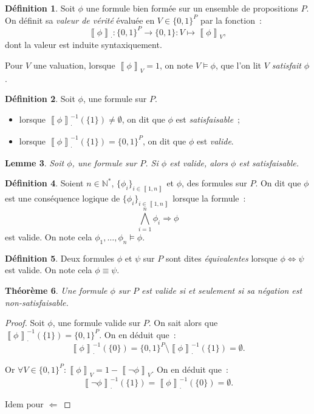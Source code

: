 \documentclass{article}
\newtheorem{thm}{Théorème}[section]
\newtheorem{lem}[thm]{Lemme}
\theoremstyle{definition}
\newtheorem{déf}[thm]{Définition}
\theoremstyle{remark}
\newcommand{\intint}[2]{\left\llbracket#1, #2\right\rrbracket}
\newcommand{\logeval}[1]{\left\llbracket#1\right\rrbracket}
\newcommand{\N}{\mathbb N}
\begin{document}
	\begin{déf} Soit $\phi$ une formule bien formée sur un ensemble de propositions $P$. On définit sa \textit{valeur de vérité} évaluée en $V \in \{0, 1\}^P$
	par la fonction~:
	\[\logeval \phi_\cdot : \{0, 1\}^P \to \{0, 1\} : V \mapsto \logeval \phi_V,\]
	dont la	valeur est induite syntaxiquement.

	Pour $V$ une valuation, lorsque $\logeval \phi_V = 1$, on note $V \models \phi$, que l'on lit \textit{$V$ satisfait $\phi$}.
	\end{déf}

	\begin{déf} Soit $\phi$, une formule sur $P$.
	\begin{itemize}
		\item lorsque $\logeval \phi_\cdot^{-1}(\{1\}) \neq \emptyset$, on dit que $\phi$ est \textit{satisfaisable}~;
		\item lorsque $\logeval \phi_\cdot^{-1}(\{1\}) = \{0, 1\}^P$, on dit que $\phi$ est \textit{valide}.
	\end{itemize}
	\end{déf}

	\begin{lem} Soit $\phi$, une formule sur $P$. Si $\phi$ est valide, alors $\phi$ est satisfaisable.
	\end{lem}

	\begin{déf} Soient $n \in \N^*$, $\{\phi_i\}_{i \in \intint 1n}$ et $\phi$, des formules sur $P$. On dit que $\phi$ est une conséquence logique de
	$\{\phi_i\}_{i \in \intint 1n}$ lorsque la formule~:
	\[\bigwedge_{i=1}^n\phi_i \Rightarrow \phi\]
	est valide. On note cela $\phi_1, \ldots, \phi_n \models \phi$.
	\end{déf}

	\begin{déf} Deux formules $\phi$ et $\psi$ sur $P$ sont dites \textit{équivalentes} lorsque $\phi \Leftrightarrow \psi$ est valide. On note cela
	$\phi \equiv \psi$.
	\end{déf}

	\begin{thm} Une formule $\phi$ sur $P$ est valide si et seulement si sa négation est non-satisfaisable.
	\end{thm}

	\begin{proof} Soit $\phi$, une formule valide sur $P$. On sait alors que $\logeval \phi_\cdot^{-1}(\{1\}) = \{0, 1\}^P$. On en déduit que~:
	\[\logeval\phi_\cdot^{-1}(\{0\}) = \{0, 1\}^P \setminus \logeval \phi_\cdot^{-1}(\{1\}) = \emptyset.\]

	Or $\forall V \in \{0, 1\}^P : \logeval \phi_V = 1-\logeval {\lnot\phi}_V$. On en déduit que~:
	\[\logeval {\lnot \phi}_\cdot^{-1}(\{1\}) = \logeval {\phi}_\cdot^{-1}(\{0\}) = \emptyset.\]

	Idem pour $\Leftarrow$
	\end{proof}
\end{document}
